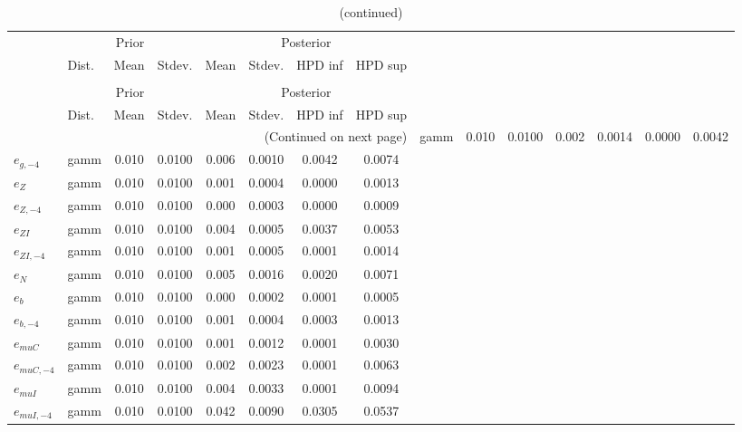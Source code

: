  
\begin{center}
\begin{longtable}{llcccccc} 
\caption{Results from Metropolis-Hastings (standard deviation of structural shocks)}
 \label{Table:MHPosterior:2}\\
\toprule 
  & \multicolumn{3}{c}{Prior}  &  \multicolumn{4}{c}{Posterior} \\
  \cmidrule(r{.75em}){2-4} \cmidrule(r{.75em}){5-8}
  & Dist. & Mean  & Stdev. & Mean & Stdev. & HPD inf & HPD sup\\
\midrule \endfirsthead 
\caption{(continued)}\\\toprule 
  & \multicolumn{3}{c}{Prior}  &  \multicolumn{4}{c}{Posterior} \\
  \cmidrule(r{.75em}){2-4} \cmidrule(r{.75em}){5-8}
  & Dist. & Mean  & Stdev. & Mean & Stdev. & HPD inf & HPD sup\\
\midrule \endhead 
\bottomrule \multicolumn{8}{r}{(Continued on next page)} \endfoot 
\bottomrule \endlastfoot 
${e_g}$ & gamm &   0.010 & 0.0100 &   0.002& 0.0014 &  0.0000 &  0.0042 \\ 
${e_{g,-4}}$ & gamm &   0.010 & 0.0100 &   0.006& 0.0010 &  0.0042 &  0.0074 \\ 
${e_Z}$ & gamm &   0.010 & 0.0100 &   0.001& 0.0004 &  0.0000 &  0.0013 \\ 
${e_{Z,-4}}$ & gamm &   0.010 & 0.0100 &   0.000& 0.0003 &  0.0000 &  0.0009 \\ 
${e_{ZI}}$ & gamm &   0.010 & 0.0100 &   0.004& 0.0005 &  0.0037 &  0.0053 \\ 
${e_{ZI,-4}}$ & gamm &   0.010 & 0.0100 &   0.001& 0.0005 &  0.0001 &  0.0014 \\ 
${e_N}$ & gamm &   0.010 & 0.0100 &   0.005& 0.0016 &  0.0020 &  0.0071 \\ 
${e_b}$ & gamm &   0.010 & 0.0100 &   0.000& 0.0002 &  0.0001 &  0.0005 \\ 
${e_{b,-4}}$ & gamm &   0.010 & 0.0100 &   0.001& 0.0004 &  0.0003 &  0.0013 \\ 
${e_{muC}}$ & gamm &   0.010 & 0.0100 &   0.001& 0.0012 &  0.0001 &  0.0030 \\ 
${e_{muC,-4}}$ & gamm &   0.010 & 0.0100 &   0.002& 0.0023 &  0.0001 &  0.0063 \\ 
${e_{muI}}$ & gamm &   0.010 & 0.0100 &   0.004& 0.0033 &  0.0001 &  0.0094 \\ 
${e_{muI,-4}}$ & gamm &   0.010 & 0.0100 &   0.042& 0.0090 &  0.0305 &  0.0537 \\ 
\end{longtable}
 \end{center}
